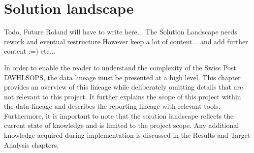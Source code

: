 \chapter{Solution landscape}

Todo, Future Roland will have to write here...
The Solution Landscape needs rework and eventual restructure
However keep a lot of content... and add further content :=)
etc...

In order to enable the reader to understand the complexity of the Swiss Post \gls{DWHLSOPS}, the data lineage must be presented at a high level. This chapter provides an overview of this lineage while deliberately omitting details that are not relevant to this project. It further explains the scope of this project within the data lineage and describes the reporting lineage with relevant tools. Furthermore, it is important to note that the solution landscape reflects the current state of knowledge and is limited to the project scope. Any additional knowledge acquired during implementation is discussed in the Results and Target Analysis chapters.




